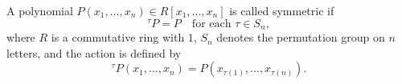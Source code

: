 A polynomial $P(x_1, \ldots, x_n) \in R[x_1, \ldots, x_n]$ is called symmetric if
$$
{}^{\tau}P = P \quad \text{for each } \tau \in S_n,
$$
where $R$ is a commutative ring with $1$, $S_n$ denotes the permutation group on $n$ letters, and the action is defined by
$$
{}^{\tau}P(x_1, \ldots, x_n) = P(x_{\tau(1)}, \ldots, x_{\tau(n)}).
$$
